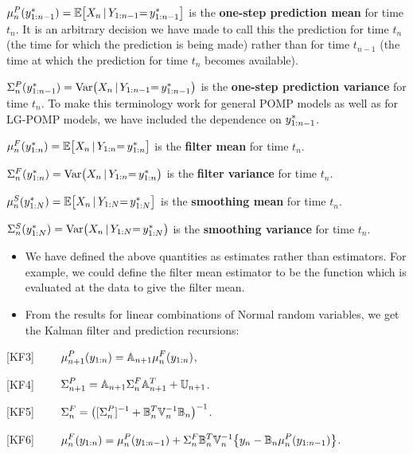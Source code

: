 \documentclass[]{article}
\begin{document}
\(\mu_n^P(y_{1:n-1}^*)=\mathbb{E}\big[X_n{\, | \,} Y_{1:n-1}{=\,} y_{1:n-1}^*\big]\)
is the \textbf{one-step prediction mean} for time \(t_n\). It is an
arbitrary decision we have made to call this the prediction for time
\(t_n\) (the time for which the prediction is being made) rather than
for time \(t_{n-1}\) (the time at which the prediction for time \(t_n\)
becomes available).

\(\Sigma_n^P(y_{1:n-1}^*)=\mathrm{Var}\big(X_n{\, | \,} Y_{1:n-1}{=\,} y_{1:n-1}^*\big)\)
is the \textbf{one-step prediction variance} for time \(t_n\). To make
this terminology work for general POMP models as well as for LG-POMP
models, we have included the dependence on \(y_{1:n-1}^*\).

\(\mu_n^F(y_{1:n}^*)=\mathbb{E}\big[X_n{\, | \,} Y_{1:n}{=\,} y_{1:n}^*\big]\)
is the \textbf{filter mean} for time \(t_n\).

\(\Sigma_n^F(y_{1:n}^*)=\mathrm{Var}\big(X_n{\, | \,} Y_{1:n}{=\,} y_{1:n}^*\big)\)
is the \textbf{filter variance} for time \(t_n\).

\(\mu_n^S(y_{1:N}^*)=\mathbb{E}\big[X_n{\, | \,} Y_{1:N}{=\,} y_{1:N}^*\big]\)
is the \textbf{smoothing mean} for time \(t_n\).

\(\Sigma_n^S(y_{1:N}^*)=\mathrm{Var}\big(X_n{\, | \,} Y_{1:N}{=\,} y_{1:N}^*\big)\)
is the \textbf{smoothing variance} for time \(t_n\).

\begin{itemize}
\item
  We have defined the above quantities as estimates rather than
  estimators. For example, we could define the filter mean estimator to
  be the function which is evaluated at the data to give the filter
  mean.
\item
  From the results for linear combinations of Normal random variables,
  we get the Kalman filter and prediction recursions:
\end{itemize}

{[}KF3{]}
\(\quad\quad \displaystyle   \mu_{n+1}^P(y_{1:n}) = \mathbb{A}_{n+1} \mu_{n}^F(y_{1:n})\),

{[}KF4{]}
\(\quad\quad \displaystyle   \Sigma_{n+1}^P = \mathbb{A}_{n+1} \Sigma_{n}^F \mathbb{A}_{n+1}^{\scriptsize{T}} + \mathbb{U}_{n+1}\).

{[}KF5{]}
\(\quad\quad \displaystyle   \Sigma_{n}^F = \big([\Sigma_n^P]^{-1} + \mathbb{B}_n^{\scriptsize{T}}\mathbb{V}_n^{-1}\mathbb{B}_n\big)^{-1}\).

{[}KF6{]}
\(\quad\quad \displaystyle   \mu_{n}^F(y_{1:n}) = \mu_{n}^P(y_{1:n-1}) + \Sigma_n^F \mathbb{B}^{\scriptsize{T}}_n\mathbb{V}_n^{-1}\big\{y_n - \mathbb{B}_n\mu_n^P(y_{1:n-1})\big\}\).
\end{document}
